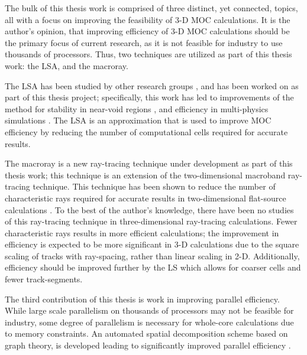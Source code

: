 {{        The bulk of this thesis work is comprised of three distinct, yet connected, topics, all with a focus on improving the feasibility of 3-D \ac{MOC} calculations.
        It is the author's opinion, that improving efficiency of 3-D \ac{MOC} calculations should be the primary focus of current research, as it is not feasible for industry to use thousands of processors.
        Thus, two techniques are utilized as part of this thesis work: the \acf{LSA}, and the macroray.

        The \ac{LSA} has been studied by other research groups \cite{Ferrer2016,Ferrer2018,Gunow2018}, and has been worked on as part of this thesis project; specifically, this work has led to improvements of the method for stability in near-void regions \cite{Fitzgerald2018}, and efficiency in multi-physics simulations \cite{Fitzgerald2019}.
        The \ac{LSA} is an approximation that is used to improve \ac{MOC} efficiency by reducing the number of computational cells required for accurate results.

        The macroray is a new ray-tracing technique under development as part of this thesis work; this technique is an extension of the two-dimensional macroband \cite{Villarino1992} ray-tracing technique.
        This technique has been shown to reduce the number of characteristic rays required for accurate results in two-dimensional flat-source calculations \cite{Yamamoto2005,Fevotte2007}.
        To the best of the author's knowledge, there have been no studies of this ray-tracing technique in three-dimensional ray-tracing calculations.
        Fewer characteristic rays results in more efficient calculations; the improvement in efficiency is expected to be more significant in 3-D calculations due to the square scaling of tracks with ray-spacing, rather than linear scaling in 2-D.
        Additionally, efficiency should be improved further by the \ac{LS} which allows for coarser cells and fewer track-segments.

        The third contribution of this thesis is work in improving parallel efficiency.
        While large scale parallelism on thousands of processors may not be feasible for industry, some degree of parallelism is necessary for whole-core calculations due to memory constraints.
        An automated spatial decomposition scheme based on graph theory, is developed leading to significantly improved parallel efficiency \cite{Fitzgerald2017,Fitzgerald2019a}.
    }
}
